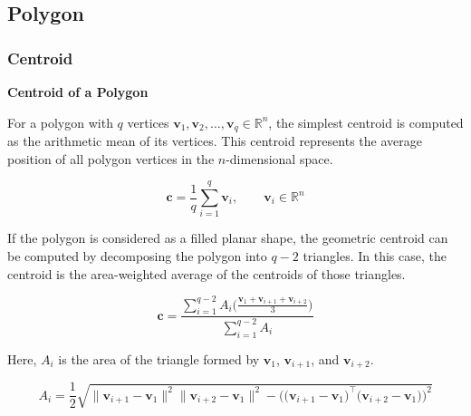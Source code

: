 \documentclass{book}
\providecommand{\ProjectDeepHeading}[2]{%
    \par\medskip\noindent\textbf{#2}\par\smallskip
}
\begin{document}
\subsection{Polygon}

\subsubsection{Centroid}


\ProjectDeepHeading{1}{Centroid of a Polygon}
        
        For a polygon with \(q\) vertices
        \(\mathbf{v}_1, \mathbf{v}_2, \dots, \mathbf{v}_q \in \mathbb{R}^{n}\),
        the simplest centroid is computed as the arithmetic mean of its vertices.
        This centroid represents the average position of all polygon vertices in the
        \(n\)-dimensional space.
        
        \[
            \mathbf{c}
            =
            \frac{1}{q}
            \sum_{i=1}^{q}
            \mathbf{v}_i,
            \qquad
            \mathbf{v}_i \in \mathbb{R}^{n}
        \]
        
        If the polygon is considered as a filled planar shape, the geometric centroid
        can be computed by decomposing the polygon into \(q-2\) triangles. In this case,
        the centroid is the area-weighted average of the centroids of those triangles.
        
        \[
            \mathbf{c}
            =
            \frac{
                \sum_{i=1}^{q-2}
                A_i
                \bigg(
                \frac{
                    \mathbf{v}_1
                    +
                    \mathbf{v}_{i+1}
                    +
                    \mathbf{v}_{i+2}
                }{3}
                \bigg)
            }{
                \sum_{i=1}^{q-2}
                A_i
            }
        \]
        
        Here, \(A_i\) is the area of the triangle formed by
        \(\mathbf{v}_1\), \(\mathbf{v}_{i+1}\), and \(\mathbf{v}_{i+2}\).
        
        \[
            A_i
            =
            \frac{1}{2}
            \sqrt{
                \lVert \mathbf{v}_{i+1} - \mathbf{v}_1 \rVert^2
                \lVert \mathbf{v}_{i+2} - \mathbf{v}_1 \rVert^2
                -
                \bigg(
                \big(
                \mathbf{v}_{i+1} - \mathbf{v}_1
                \big)^{\top}
                \big(
                \mathbf{v}_{i+2} - \mathbf{v}_1
                \big)
                \bigg)^2
            }
        \]
        
\end{document}
